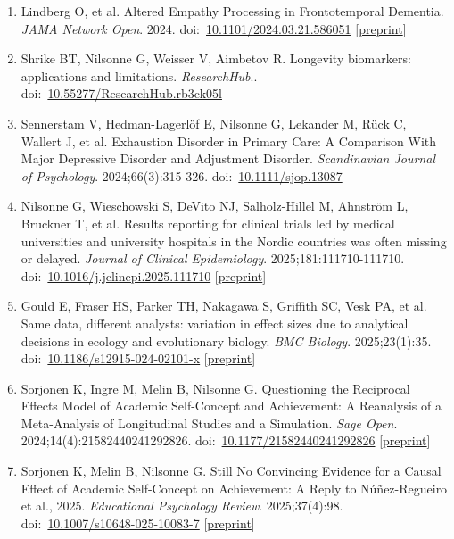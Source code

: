 \documentclass[10pt,a4paper,twocolumn]{article}
\begin{document}
\begin{enumerate}
    \item Lindberg O, et al. Altered Empathy Processing in Frontotemporal Dementia. \textit{JAMA Network Open}. 2024. doi:~\href{https://doi.org/10.1101/2024.03.21.586051}{10.1101/2024.03.21.586051} [\href{https://doi.org/10.1001/jamanetworkopen.2024.48601}{preprint}]

    \item Shrike BT, Nilsonne G, Weisser V, Aimbetov R. Longevity biomarkers: applications and limitations. \textit{ResearchHub}.. doi:~\href{https://doi.org/10.55277/ResearchHub.rb3ck05l}{10.55277/ResearchHub.rb3ck05l}

    \item Sennerstam V, Hedman-Lagerlöf E, Nilsonne G, Lekander M, Rück C, Wallert J, et al. Exhaustion Disorder in Primary Care: A Comparison With Major Depressive Disorder and Adjustment Disorder. \textit{Scandinavian Journal of Psychology}. 2024;66(3):315-326. doi:~\href{https://doi.org/10.1111/sjop.13087}{10.1111/sjop.13087}

    \item Nilsonne G, Wieschowski S, DeVito NJ, Salholz-Hillel M, Ahnström L, Bruckner T, et al. Results reporting for clinical trials led by medical universities and university hospitals in the Nordic countries was often missing or delayed. \textit{Journal of Clinical Epidemiology}. 2025;181:111710-111710. doi:~\href{https://doi.org/10.1016/j.jclinepi.2025.111710}{10.1016/j.jclinepi.2025.111710} [\href{https://doi.org/10.1101/2024.02.04.24301363}{preprint}]

    \item Gould E, Fraser HS, Parker TH, Nakagawa S, Griffith SC, Vesk PA, et al. Same data, different analysts: variation in effect sizes due to analytical decisions in ecology and evolutionary biology. \textit{BMC Biology}. 2025;23(1):35. doi:~\href{https://doi.org/10.1186/s12915-024-02101-x}{10.1186/s12915-024-02101-x} [\href{https://doi.org/10.32942/X2GG62}{preprint}]

    \item Sorjonen K, Ingre M, Melin B, Nilsonne G. Questioning the Reciprocal Effects Model of Academic Self-Concept and Achievement: A Reanalysis of a Meta-Analysis of Longitudinal Studies and a Simulation. \textit{Sage Open}. 2024;14(4):21582440241292826. doi:~\href{https://doi.org/10.1177/21582440241292826}{10.1177/21582440241292826} [\href{https://doi.org/10.31234/osf.io/qd4bj}{preprint}]

    \item Sorjonen K, Melin B, Nilsonne G. Still No Convincing Evidence for a Causal Effect of Academic Self-Concept on Achievement: A Reply to Núñez-Regueiro et al., 2025. \textit{Educational Psychology Review}. 2025;37(4):98. doi:~\href{https://doi.org/10.1007/s10648-025-10083-7}{10.1007/s10648-025-10083-7} [\href{https://doi.org/10.31234/osf.io/fe89w_v1}{preprint}]


\end{enumerate}
\end{document}

